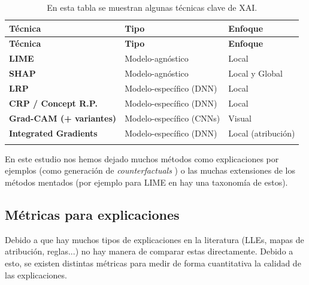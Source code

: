 \begin{longtable}{|p{3.5cm}|p{3.5cm}|p{3.5cm}|}
\hline
\textbf{Técnica} & \textbf{Tipo} & \textbf{Enfoque} \\
\hline
\endfirsthead
\hline
\textbf{Técnica} & \textbf{Tipo} & \textbf{Enfoque} \\
\hline
\endhead

\textbf{LIME} & Modelo-agnóstico & Local \\
\hline

\textbf{SHAP} & Modelo-agnóstico  & Local y Global  \\
\hline

\textbf{LRP} & Modelo-específico (DNN) & Local \\
\hline

\textbf{CRP / Concept R.P.} & Modelo-específico (DNN) & Local\\
\hline

\textbf{Grad-CAM (+ variantes)} & Modelo-específico (CNNs) & Visual  \\
\hline

\textbf{Integrated Gradients} & Modelo-específico (DNN) & Local (atribución) \\
\hline

\caption{En esta tabla se muestran algunas técnicas clave de XAI.}
\label{tab:xai_explicaciones}
\end{longtable}

En este estudio nos hemos dejado muchos métodos como explicaciones por ejemplos (como generación de \textit{counterfactuals} \cite{counterfactuals}) o las muchas extensiones de los métodos mentados (por ejemplo para LIME en \cite{LIMESURVEY} hay una taxonomía de estos).


\subsection*{Métricas para explicaciones}

Debido a que hay muchos tipos de explicaciones en la literatura (LLEs, mapas de atribución, reglas...) no hay manera de comparar estas directamente. Debido a esto, se existen distintas métricas para medir de forma cuantitativa la calidad de las explicaciones.

